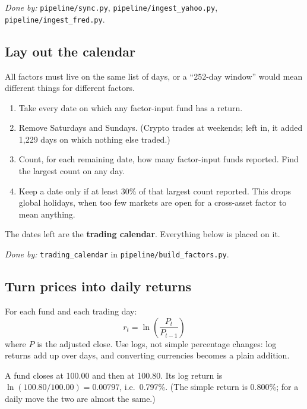 \documentclass[11pt,a4paper]{article}
\newcommand{\doneby}[1]{\par{\raggedright\small\textit{Done by:} #1\par}}
\begin{document}
\doneby{\texttt{pipeline/sync.py}, \texttt{pipeline/ingest\_yahoo.py}, \texttt{pipeline/ingest\_fred.py}.}

\subsection{Lay out the calendar}

All factors must live on the same list of days, or a ``252-day window'' would mean
different things for different factors.

\begin{method}
\begin{enumerate}[leftmargin=1.4em]
  \item Take every date on which any factor-input fund has a return.
  \item Remove Saturdays and Sundays. (Crypto trades at weekends; left in, it added 1,229 days on which nothing else traded.)
  \item Count, for each remaining date, how many factor-input funds reported. Find the largest count on any day.
  \item Keep a date only if at least 30\% of that largest count reported. This drops global holidays, when too few markets are open for a cross-asset factor to mean anything.
\end{enumerate}
The dates left are the \textbf{trading calendar}. Everything below is placed on it.
\end{method}

\doneby{\texttt{trading\_calendar} in \texttt{pipeline/build\_factors.py}.}

\subsection{Turn prices into daily returns}

\begin{method}
For each fund and each trading day:
\[
  r_t = \ln\!\left(\frac{P_t}{P_{t-1}}\right)
\]
where $P$ is the adjusted close. Use logs, not simple percentage changes: log
returns add up over days, and converting currencies becomes a plain addition.
\end{method}

\begin{example}
A fund closes at 100.00 and then at 100.80. Its log return is
$\ln(100.80/100.00) = 0.00797$, i.e.\ 0.797\%. (The simple return is 0.800\%; for a
daily move the two are almost the same.)
\end{example}
\end{document}
